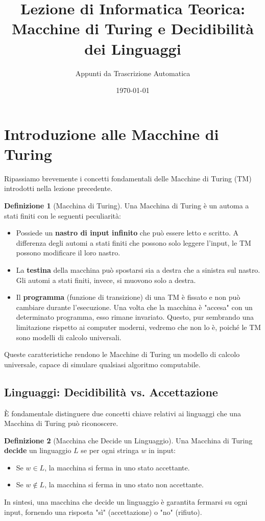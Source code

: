 \documentclass[a4paper]{article}
\title{Lezione di Informatica Teorica: Macchine di Turing e Decidibilità dei Linguaggi}
\author{Appunti da Trascrizione Automatica}
\date{\today}
\theoremstyle{definition} %
\newtheorem{definition}{Definizione}
\begin{document}
\maketitle
\tableofcontents
\newpage

\section{Introduzione alle Macchine di Turing}

Ripassiamo brevemente i concetti fondamentali delle Macchine di Turing (TM) introdotti nella lezione precedente.

\begin{definition}[Macchina di Turing]
Una Macchina di Turing è un automa a stati finiti con le seguenti peculiarità:
\begin{itemize}
    \item Possiede un \textbf{nastro di input infinito} che può essere letto e scritto. A differenza degli automi a stati finiti che possono solo leggere l'input, le TM possono modificare il loro nastro.
    \item La \textbf{testina} della macchina può spostarsi sia a destra che a sinistra sul nastro. Gli automi a stati finiti, invece, si muovono solo a destra.
    \item Il \textbf{programma} (funzione di transizione) di una TM è fissato e non può cambiare durante l'esecuzione. Una volta che la macchina è "accesa" con un determinato programma, esso rimane invariato. Questo, pur sembrando una limitazione rispetto ai computer moderni, vedremo che non lo è, poiché le TM sono modelli di calcolo universali.
\end{itemize}
Queste caratteristiche rendono le Macchine di Turing un modello di calcolo universale, capace di simulare qualsiasi algoritmo computabile.
\end{definition}

\subsection{Linguaggi: Decidibilità vs. Accettazione}

È fondamentale distinguere due concetti chiave relativi ai linguaggi che una Macchina di Turing può riconoscere.

\begin{definition}[Macchina che Decide un Linguaggio]
Una Macchina di Turing \textbf{decide} un linguaggio $L$ se per ogni stringa $w$ in input:
\begin{itemize}
    \item Se $w \in L$, la macchina si ferma in uno stato accettante.
    \item Se $w \notin L$, la macchina si ferma in uno stato non accettante.
\end{itemize}
In sintesi, una macchina che decide un linguaggio è garantita fermarsi su ogni input, fornendo una risposta "sì" (accettazione) o "no" (rifiuto).
\end{definition}
\end{document}

